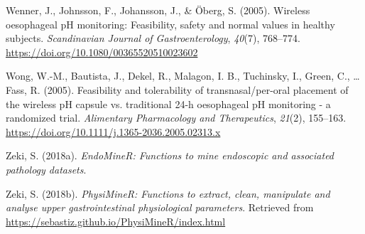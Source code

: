 \documentclass[english,man,floatsintext]{apa6}
\begin{document}
\leavevmode\hypertarget{ref-Wenner2005}{}%
Wenner, J., Johnsson, F., Johansson, J., \& Öberg, S. (2005). Wireless oesophageal pH monitoring: Feasibility, safety and normal values in healthy subjects. \emph{Scandinavian Journal of Gastroenterology}, \emph{40}(7), 768--774. \url{https://doi.org/10.1080/00365520510023602}

\leavevmode\hypertarget{ref-Wong2005a}{}%
Wong, W.-M., Bautista, J., Dekel, R., Malagon, I. B., Tuchinsky, I., Green, C., \ldots{} Fass, R. (2005). Feasibility and tolerability of transnasal/per-oral placement of the wireless pH capsule vs. traditional 24-h oesophageal pH monitoring - a randomized trial. \emph{Alimentary Pharmacology and Therapeutics}, \emph{21}(2), 155--163. \url{https://doi.org/10.1111/j.1365-2036.2005.02313.x}

\leavevmode\hypertarget{ref-R-EndoMineR}{}%
Zeki, S. (2018a). \emph{EndoMineR: Functions to mine endoscopic and associated pathology datasets}.

\leavevmode\hypertarget{ref-R-PhysiMineR}{}%
Zeki, S. (2018b). \emph{PhysiMineR: Functions to extract, clean, manipulate and analyse upper gastrointestinal physiological parameters}. Retrieved from \url{https://sebastiz.github.io/PhysiMineR/index.html}

\endgroup
\end{document}

